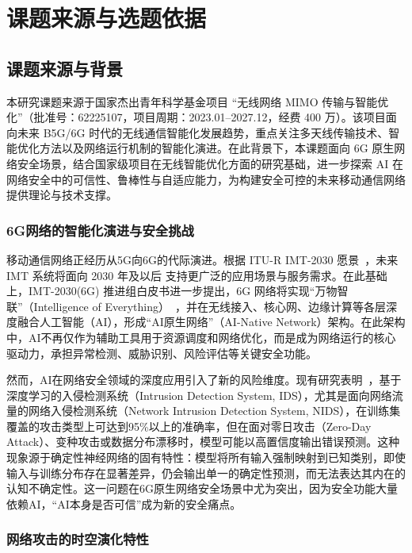 

\section{课题来源与选题依据}

\subsection{课题来源与背景}
本研究课题来源于国家杰出青年科学基金项目
“无线网络 MIMO 传输与智能优化”（批准号：62225107，项目周期：2023.01–2027.12，经费 400 万）。该项目面向未来 B5G/6G 时代的无线通信智能化发展趋势，重点关注多天线传输技术、智能优化方法以及网络运行机制的智能化演进。在此背景下，本课题面向 6G 原生网络安全场景，结合国家级项目在无线智能优化方面的研究基础，进一步探索 AI 在网络安全中的可信性、鲁棒性与自适应能力，为构建安全可控的未来移动通信网络提供理论与技术支撑。

\subsubsection{6G网络的智能化演进与安全挑战}

移动通信网络正经历从5G向6G的代际演进。根据 ITU-R IMT-2030 愿景~\cite{ITU_IMT2030_2023}，未来 IMT 系统将面向 2030 年及以后
支持更广泛的应用场景与服务需求。在此基础上，IMT-2030(6G) 推进组白皮书进一步提出，6G 网络将实现“万物智联”（Intelligence of Everything）~\cite{IMT2030_6G_WhitePaper_2021}，并在无线接入、核心网、边缘计算等各层深度融合人工智能（AI），形成``AI原生网络''（AI-Native Network）架构。在此架构中，AI不再仅作为辅助工具用于资源调度和网络优化，而是成为网络运行的核心驱动力，承担异常检测、威胁识别、风险评估等关键安全功能。

然而，AI在网络安全领域的深度应用引入了新的风险维度。现有研究表明~\cite{BCNN-IDS,Tabarisaadi2024}，基于深度学习的入侵检测系统（Intrusion Detection System, IDS），尤其是面向网络流量的网络入侵检测系统（Network Intrusion Detection System, NIDS），在训练集覆盖的攻击类型上可达到95\%以上的准确率，但在面对零日攻击（Zero-Day Attack）、变种攻击或数据分布漂移时，模型可能以高置信度输出错误预测。这种现象源于确定性神经网络的固有特性：模型将所有输入强制映射到已知类别，即使输入与训练分布存在显著差异，仍会输出单一的确定性预测，而无法表达其内在的认知不确定性。这一问题在6G原生网络安全场景中尤为突出，因为安全功能大量依赖AI，``AI本身是否可信''成为新的安全痛点。

\subsubsection{网络攻击的时空演化特性}

